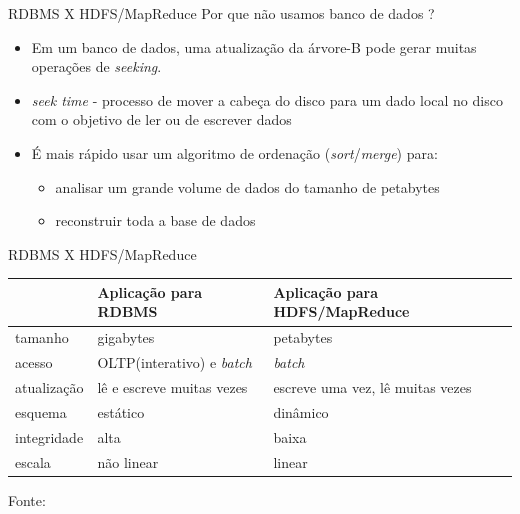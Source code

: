   \begin{frame}{RDBMS X HDFS/MapReduce}
    Por que não usamos banco de dados ?
     \begin{itemize}
        \item<1->  Em um banco de dados, uma atualização da árvore-B pode gerar muitas operações de \emph{seeking}.
        \item<2->  \emph{seek time} - processo de mover a cabeça do disco para um dado local no disco com o objetivo de ler ou de escrever dados
        \item<3->  É mais rápido usar um algoritmo de ordenação (\emph{sort}/\emph{merge}) para:
          \begin{itemize}
             \item<4-> analisar um grande volume de dados do tamanho de petabytes
             \item<5-> reconstruir toda a base de dados
          \end{itemize}
      \end{itemize}
  \end{frame}

  \begin{frame}{RDBMS X HDFS/MapReduce}
{\small
        \begin{center}
          \begin{tabular}{|p{2cm}||p{3.5cm}||p{3.5cm}|}
            \hline
& Aplicação para RDBMS & Aplicação para HDFS/MapReduce\\ \hline
tamanho & gigabytes & petabytes\\ \hline
acesso & OLTP(interativo) e \emph{batch} & \emph{batch}\\ \hline
atualização & lê e escreve muitas vezes & escreve uma vez, lê muitas vezes\\ \hline
esquema & estático & dinâmico\\ \hline
integridade & alta & baixa\\ \hline
escala & não linear & linear\\ \hline
          \end{tabular}
        \end{center}
}

Fonte: \cite{White:2009}
  \end{frame}

